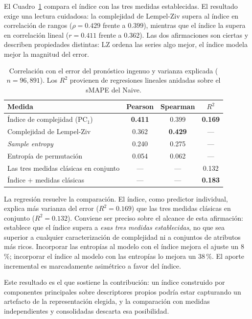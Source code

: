 El Cuadro~\ref{tab:validacion} compara el índice con las tres medidas establecidas.
El resultado exige una lectura cuidadosa: la complejidad de Lempel-Ziv supera al
índice en correlación de rangos ($\rho=0.429$ frente a $0.399$), mientras que el
índice la supera en correlación lineal ($r=0.411$ frente a $0.362$). Las dos
afirmaciones son ciertas y describen propiedades distintas: LZ ordena las series
algo mejor, el índice modela mejor la magnitud del error.

\begin{table}[htbp]
\centering
\caption{Correlación con el error del pronóstico ingenuo y varianza explicada
($n=96{,}891$). Los $R^{2}$ provienen de regresiones lineales anidadas sobre el
sMAPE del Naive.}
\label{tab:validacion}
\begin{tabular}{lccc}
\toprule
\textbf{Medida} & \textbf{Pearson} & \textbf{Spearman} & \textbf{$R^{2}$} \\
\midrule
Índice de complejidad ($\mathrm{PC}_1$) & \textbf{0.411} & 0.399 & \textbf{0.169} \\
Complejidad de Lempel-Ziv               & 0.362 & \textbf{0.429} & --- \\
\emph{Sample entropy}                   & 0.240 & 0.275 & --- \\
Entropía de permutación                 & 0.054 & 0.062 & --- \\
\midrule
Las tres medidas clásicas en conjunto   & ---   & ---   & 0.132 \\
Índice $+$ medidas clásicas             & ---   & ---   & \textbf{0.183} \\
\bottomrule
\end{tabular}
\end{table}

La regresión resuelve la comparación. El índice, como predictor individual, explica
más varianza del error ($R^{2}=0.169$) que las tres medidas clásicas en conjunto
($R^{2}=0.132$). Conviene ser preciso sobre el alcance de esta afirmación: establece
que el índice supera a \emph{esas tres medidas establecidas}, no que sea superior a
cualquier caracterización de complejidad ni a conjuntos de atributos más ricos. Incorporar las entropías al modelo con el índice mejora el ajuste
un 8\,\%; incorporar el índice al modelo con las entropías lo mejora un 38\,\%. El
aporte incremental es marcadamente asimétrico a favor del índice.

Este resultado es el que sostiene la contribución: un índice construido por
componentes principales sobre descriptores propios podría estar capturando un
artefacto de la representación elegida, y la comparación con medidas independientes
y consolidadas descarta esa posibilidad.

